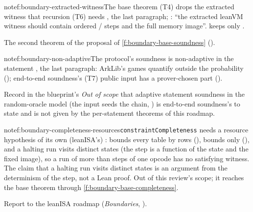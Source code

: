 \begin{finding}{note}{f:boundary-extracted-witness}{The base theorem (T4) drops the extracted witness that recursion (T6) needs}
 , the last paragraph;
: \enquote{the extracted leanVM witness should contain ordered
/ steps and the full memory image}.
 keeps only .

 The second theorem of the proposal of \cref{f:boundary-base-soundness}
().
\end{finding}

\begin{finding}{note}{f:boundary-non-adaptive}{The protocol's soundness is non-adaptive in the statement}
 , the last paragraph: ArkLib's games quantify
 outside the probability (); end-to-end
soundness's (T7) public input has a prover-chosen part ().

 Record in the blueprint's \emph{Out of scope} that adaptive statement
soundness in the random-oracle model (the input seeds the chain, ) is
end-to-end soundness's to state and is not given by the per-statement theorems of this roadmap.
\end{finding}

\begin{finding}{note}{f:boundary-completeness-resources}{\texttt{constraintCompleteness} needs a resource hypothesis of its own (leanISA's)}
 :  bounds every table by
 rows (),  bounds only 
(), and a halting run visits distinct  states (the step
is a function of the state and the fixed image), so a run of more than  steps of one
opcode has no satisfying witness. The claim that a halting run visits distinct states is an
argument from the determinism of the step, not a Lean proof. Out of this review's scope; it
reaches the base theorem through \cref{f:boundary-base-completeness}.

 Report to the leanISA roadmap (\emph{Boundaries}, ).
\end{finding}
